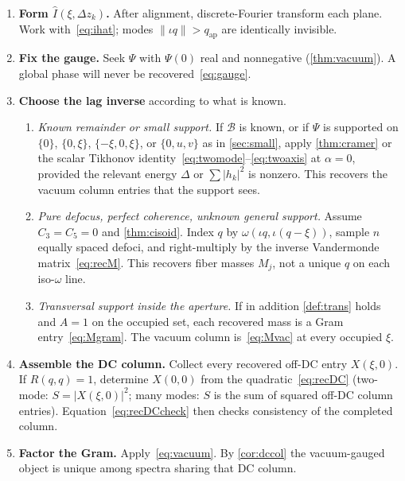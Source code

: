 \documentclass[11pt,a4paper]{article}
\theoremstyle{definition}
\theoremstyle{remark}
\newcommand{\abs}[1]{\lvert#1\rvert}
\newcommand{\norm}[1]{\lVert#1\rVert}
\newcommand{\qap}{q_{\mathrm{ap}}}
\newcommand{\Dz}{\Delta z}
\begin{document}
\begin{enumerate}[leftmargin=*,itemsep=0.35em]
\item \textbf{Form $\hat I(\xi,\Dz_k)$.}
After alignment, discrete-Fourier transform each plane.
Work with~\eqref{eq:ihat}; modes $\norm{\iota q}>\qap$ are
identically invisible.

\item \textbf{Fix the gauge.}
Seek $\Psi$ with $\Psi(0)$ real and nonnegative
(\cref{thm:vacuum}).
A global phase will never be recovered~\eqref{eq:gauge}.

\item \textbf{Choose the lag inverse} according to what is known.

\begin{enumerate}[label=\alph*.,itemsep=0.25em]
\item \emph{Known remainder or small support.}
If $\mathcal{B}$ is known, or if $\Psi$ is supported on
$\{0\}$, $\{0,\xi\}$, $\{-\xi,0,\xi\}$, or $\{0,u,v\}$ as in
\cref{sec:small}, apply \cref{thm:cramer} or the scalar
Tikhonov identity~\eqref{eq:twomode}--\eqref{eq:twoaxis} at
$\alpha=0$, provided the relevant energy $\Delta$ or
$\sum\abs{h_k}^2$ is nonzero.
This recovers the vacuum column entries that the support sees.

\item \emph{Pure defocus, perfect coherence, unknown general
support.}
Assume $C_3=C_5=0$ and \cref{thm:cisoid}.
Index $q$ by $\omega(\iota q,\iota(q-\xi))$, sample $n$ equally
spaced defoci, and right-multiply by the inverse Vandermonde
matrix~\eqref{eq:recM}.
This recovers fiber masses $M_j$, not a unique $q$ on each
iso-$\omega$ line.

\item \emph{Transversal support inside the aperture.}
If in addition \cref{def:trans} holds and $A=1$ on the occupied
set, each recovered mass is a Gram entry~\eqref{eq:Mgram}.
The vacuum column is~\eqref{eq:Mvac} at every occupied $\xi$.
\end{enumerate}

\item \textbf{Assemble the DC column.}
Collect every recovered off-DC entry $X(\xi,0)$.
If $R(q,q)=1$, determine $X(0,0)$ from the quadratic~\eqref{eq:recDC}
(two-mode: $S=\abs{X(\xi,0)}^2$; many modes: $S$ is the sum of
squared off-DC column entries).
Equation~\eqref{eq:recDCcheck} then checks consistency of the
completed column.

\item \textbf{Factor the Gram.}
Apply~\eqref{eq:vacuum}.
By \cref{cor:dccol} the vacuum-gauged object is unique among
spectra sharing that DC column.
\end{enumerate}
\end{document}
